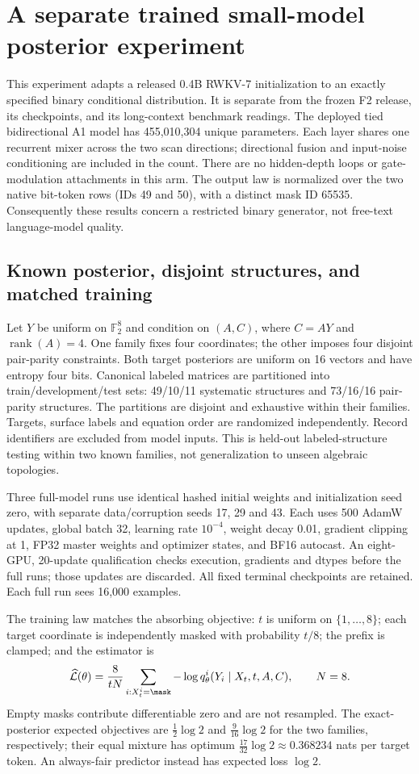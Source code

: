 \section{A separate trained small-model posterior experiment}
\label{app:train04}
This experiment adapts a released 0.4B RWKV-7 initialization to an exactly specified binary conditional distribution. It is separate from the frozen F2 release, its checkpoints, and its long-context benchmark readings. The deployed tied bidirectional A1 model has 455,010,304 unique parameters. Each layer shares one recurrent mixer across the two scan directions; directional fusion and input-noise conditioning are included in the count. There are no hidden-depth loops or gate-modulation attachments in this arm. The output law is normalized over the two native bit-token rows (IDs 49 and 50), with a distinct mask ID 65535. Consequently these results concern a restricted binary generator, not free-text language-model quality.

\subsection{Known posterior, disjoint structures, and matched training}
Let $Y$ be uniform on $\mathbb F_2^8$ and condition on $(A,C)$, where $C=AY$ and $\operatorname{rank}(A)=4$. One family fixes four coordinates; the other imposes four disjoint pair-parity constraints. Both target posteriors are uniform on 16 vectors and have entropy four bits. Canonical labeled matrices are partitioned into train/development/test sets: 49/10/11 systematic structures and 73/16/16 pair-parity structures. The partitions are disjoint and exhaustive within their families. Targets, surface labels and equation order are randomized independently. Record identifiers are excluded from model inputs. This is held-out labeled-structure testing within two known families, not generalization to unseen algebraic topologies.

Three full-model runs use identical hashed initial weights and initialization seed zero, with separate data/corruption seeds 17, 29 and 43. Each uses 500 AdamW updates, global batch 32, learning rate $10^{-4}$, weight decay 0.01, gradient clipping at 1, FP32 master weights and optimizer states, and BF16 autocast. An eight-GPU, 20-update qualification checks execution, gradients and dtypes before the full runs; those updates are discarded. All fixed terminal checkpoints are retained. Each full run sees 16,000 examples.

The training law matches the absorbing objective: $t$ is uniform on $\{1,\ldots,8\}$; each target coordinate is independently masked with probability $t/8$; the prefix is clamped; and the estimator is
\begin{equation}
\widehat{\mathcal L}(\theta)=\frac{8}{tN}\sum_{i:X_t^i=\mask}-\log q_\theta^i(Y_i\mid X_t,t,A,C),\qquad N=8.
\end{equation}
Empty masks contribute differentiable zero and are not resampled. The exact-posterior expected objectives are $\tfrac12\log 2$ and $\tfrac9{16}\log 2$ for the two families, respectively; their equal mixture has optimum $\tfrac{17}{32}\log 2\approx0.368234$ nats per target token. An always-fair predictor instead has expected loss $\log 2$.

